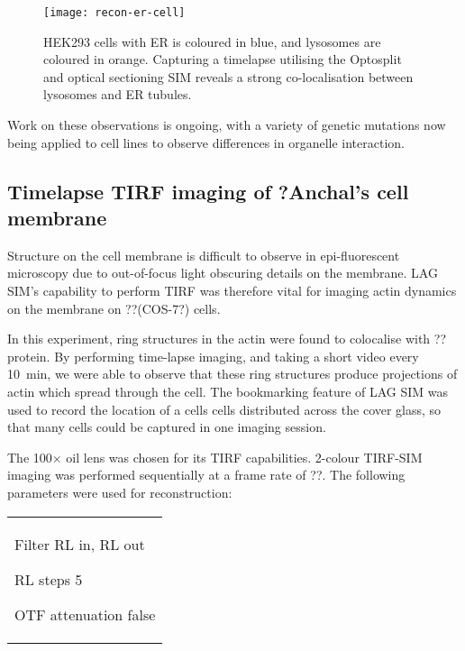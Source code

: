 \begin{figure}[tbp!]
\centering
\texttt{[image: recon-er-cell]}
\caption[LAG SIM: Fast, multi-colour imaging of ER in cells reveals co-localisation between lysosomes and ER tubules]{HEK293 cells with ER is coloured in blue, and lysosomes are coloured in orange. Capturing a timelapse utilising the Optosplit and optical sectioning SIM reveals a strong co-localisation between lysosomes and ER tubules. }
\label{fig:recon-er-cell}
\end{figure}

Work on these observations is ongoing, with a variety of genetic mutations now being applied to cell lines to observe differences in organelle interaction. 


\subsection{Timelapse TIRF imaging of ?Anchal's cell membrane}
Structure on the cell membrane is difficult to observe in epi-fluorescent microscopy due to out-of-focus light obscuring details on the membrane. 
LAG SIM's capability to perform TIRF was therefore vital for imaging actin dynamics on the membrane on ??(COS-7?) cells. 

In this experiment, ring structures in the actin were found to colocalise with ??protein. 
By performing time-lapse imaging, and taking a short video every \SI{10}{\minute}, we were able to observe that these ring structures produce projections of actin which spread through the cell. 
The bookmarking feature of LAG SIM was used to record the location of a cells cells distributed across the cover glass, so that many cells could be captured in one imaging session. 

The 100$\times$ oil lens was chosen for its TIRF capabilities. 
2-colour TIRF-SIM imaging was performed sequentially at a frame rate of ??. 
The following parameters were used for reconstruction: \newline
\begin{tabular}{p{}}
\begin{labelling}[margin=OTF attenuation]
	\item[Filter] RL in, RL out
	\item[RL steps] 5
	\item[OTF attenuation] false
\end{labelling}
\end{tabular}

